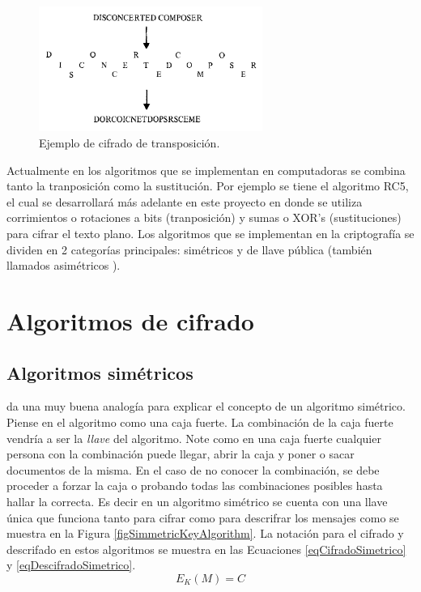 \begin{figure}
	\centering
	\includegraphics[width=0.65\textwidth]{./images/figExampleTranspositionCipher}
	\caption{Ejemplo de cifrado de transposición.}
	\label{figExampleTranspositionCipher}
\end{figure}


Actualmente en los algoritmos que se implementan en computadoras se combina tanto la tranposición como la sustitución. Por ejemplo se tiene el algoritmo RC5, el cual se desarrollará más adelante en este proyecto en donde se utiliza corrimientos o rotaciones a bits (tranposición) y sumas o XOR's (sustituciones) para cifrar el texto plano. Los algoritmos que se implementan en la criptografía se dividen en 2 categorías principales: simétricos y de llave pública (también llamados asimétricos \cite{???}).


\section{Algoritmos de cifrado}
\subsection{Algoritmos simétricos}
\cite{bruce} da una muy buena analogía para explicar el concepto de un algoritmo simétrico. Piense en el algoritmo como una caja fuerte. La combinación de la caja fuerte vendría a ser la \textit{llave} del algoritmo. Note como en una caja fuerte cualquier persona con la combinación puede llegar, abrir la caja y poner o sacar documentos de la misma. En el caso de no conocer la combinación, se debe proceder a forzar la caja o probando todas las combinaciones posibles hasta hallar la correcta. Es decir en un algoritmo simétrico se cuenta con una llave única que funciona tanto para cifrar como para descrifrar los mensajes como se muestra en la Figura \ref{figSimmetricKeyAlgorithm}. La notación para el cifrado y descrifado en estos algoritmos se muestra en las Ecuaciones \eqref{eqCifradoSimetrico} y \eqref{eqDescifradoSimetrico}.
\begin{equation}\label{eqCifradoSimetrico}
E_K (M) = C
\end{equation}

